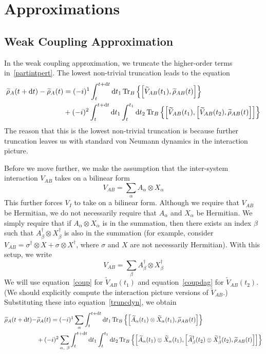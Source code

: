 \documentclass[aps, prl, preprint]{revtex4-1}
\newcommand{\ten}{\otimes}
\newcommand{\Ptra}[2]{\Tr_{#1}\left\{#2\right\}}
\newcommand{\til}[1]{\widetilde{#1}}
\begin{document}
\section{Approximations}

\subsection{Weak Coupling Approximation}

In the weak coupling approximation, we truncate the higher-order terms in~\ref{partintpert}. The lowest non-trivial truncation leads to the equation
\begin{align}\label{truncdyn}
\begin{split}
\til{\rho}_{A}(t+\dd{t}) - \til{\rho}_{A}(t) &= (-i)^1\int_t^{t+\dd{t}}\dd{t_1}\Ptra{B}{\comm{\til{V}_{AB}(t_1)}{\til{\rho}_{AB}(t)}}\\
&+(-i)^2\int_t^{t+\dd{t}}\dd{t_1}\int_t^{t_1}\dd{t_2}\Ptra{B}{\comm{\til{V}_{AB}(t_1)}{\comm{\til{V}_{AB}(t_2)}{\til{\rho}_{AB}(t)}}}
\end{split}
\end{align}
The reason that this is the lowest non-trivial truncation is because further truncation leaves us with standard von Neumann dynamics in the interaction picture.

Before we move further, we make the assumption that the inter-system interaction $V_{AB}$ takes on a bilinear form
\begin{equation}\label{coup}
V_{AB} = \sum_{\alpha} A_{\alpha}\ten X_{\alpha}
\end{equation}
This further forces $V_I$ to take on a bilinear form. Although we require that $V_{AB}$ be Hermitian, we do not necessarily require that $A_{\alpha}$ and $X_{\alpha}$ be Hermitian. We simply require that if $A_{\alpha}\ten X_{\alpha}$ is in the summation, then there exists an index $\beta$ such that $A_{\beta}^{\dag}\ten X_{\beta}^{\dag}$ is also in the summation (for example, consider $V_{AB} = \sigma^{\dag}\ten X + \sigma\ten X^{\dag}$, where $\sigma$ and $X$ are not necessarily Hermitian). With this setup, we write
\begin{equation}\label{coupdag}
V_{AB} = \sum_{\beta} A_{\beta}^{\dag}\ten X_{\beta}^{\dag}
\end{equation}
We will use equation~\ref{coup} for $\til{V}_{AB}(t_1)$ and equation~\ref{coupdag} for $\til{V}_{AB}(t_2)$. (We should explicitly compute the interaction picture versions of $\til{V}_{AB}$.) Substituting these into equation~\ref{truncdyn}, we obtain
\begin{align}\label{ugh}
\begin{split}
\til{\rho}_{A}(t+\dd{t}) - &\til{\rho}_{A}(t) = (-i)^1\sum_{\alpha}\int_t^{t+\dd{t}}\dd{t_1}\Ptra{B}{\comm{\til{A}_{\alpha}(t_1)\ten \til{X}_{\alpha}(t_1)}{\til{\rho}_{AB}(t)}}\\
&+(-i)^2\sum_{\alpha,\ \beta}\int_t^{t+\dd{t}}\dd{t_1}\int_t^{t_1}\dd{t_2}\Ptra{B}{\comm{\til{A}_{\alpha}(t_1)\ten \til{X}_{\alpha}(t_1)}{\comm{\til{A}_{\beta}^{\dag}(t_2)\ten \til{X}_{\beta}^{\dag}(t_2)}{\til{\rho}_{AB}(t)}}}
\end{split}
\end{align}
\end{document}
